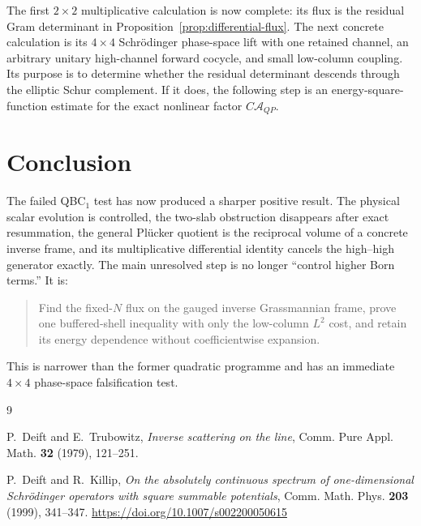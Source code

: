 \documentclass[11pt]{article}
\theoremstyle{definition}
\begin{document}
The first $2\times2$ multiplicative calculation is now complete: its flux is
the residual Gram determinant in Proposition~\ref{prop:differential-flux}.
The next concrete calculation is its $4\times4$ Schr\"odinger phase-space
lift with one retained channel, an arbitrary unitary high-channel forward
cocycle, and small low-column coupling.  Its purpose is to determine whether
the residual determinant descends through the elliptic Schur complement.  If
it does, the following step is an energy-square-function estimate for the
exact nonlinear factor $C\mathcal A_{QP}$.

\section{Conclusion}

The failed QBC$_1$ test has now produced a sharper positive result.  The
physical scalar evolution is controlled, the two-slab obstruction disappears
after exact resummation, the general Pl\"ucker quotient is the reciprocal
volume of a concrete inverse frame, and its multiplicative differential
identity cancels the high--high generator exactly.  The main unresolved step is no longer
``control higher Born terms.''  It is:
\begin{quote}
Find the fixed-$N$ flux on the gauged inverse Grassmannian frame, prove one
buffered-shell inequality with only the low-column $L^2$ cost, and retain its
energy dependence without coefficientwise expansion.
\end{quote}
This is narrower than the former quadratic programme and has an immediate
$4\times4$ phase-space falsification test.

\begin{thebibliography}{9}

P.~Deift and E.~Trubowitz,
\emph{Inverse scattering on the line},
Comm. Pure Appl. Math. \textbf{32} (1979), 121--251.

P.~Deift and R.~Killip,
\emph{On the absolutely continuous spectrum of one-dimensional Schr\"odinger operators with square summable potentials},
Comm. Math. Phys. \textbf{203} (1999), 341--347.
\url{https://doi.org/10.1007/s002200050615}

\end{thebibliography}
\end{document}
